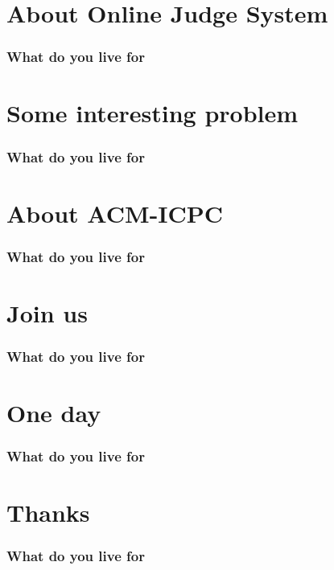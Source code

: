 \documentclass{beamer}
\begin{document}
\section{About Online Judge System}
\begin{frame}
\frametitle{What do you live for}

\end{frame}


\section{Some interesting problem}
\begin{frame}
\frametitle{What do you live for}

\end{frame}


\section{About ACM-ICPC}
\begin{frame}
\frametitle{What do you live for}

\end{frame}


\section{Join us}
\begin{frame}
\frametitle{What do you live for}

\end{frame}


\section{One day}
\begin{frame}
\frametitle{What do you live for}

\end{frame}


\section{Thanks}
\begin{frame}
\frametitle{What do you live for}

\end{frame}

  
 
\end{document}
